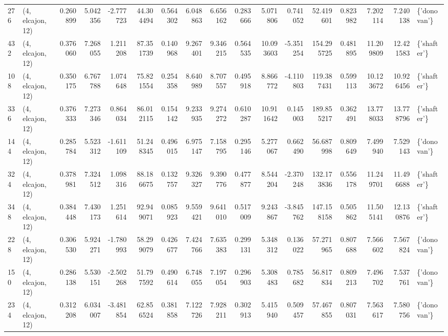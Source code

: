 \begin{tabular}{llrrrrrrrrrrrrrrl}
276 &  (4, elcajon, 12) &   0.260899 &   5.042356 &  -2.777723 &    44.304494 &   0.564302 &   6.048863 &   6.656162 &  0.283666 &   5.071806 &   0.741052 &    52.419601 &   0.823982 &   7.202114 &   7.240138 &  \{'donovan'\} \\
432 &  (4, elcajon, 12) &   0.376060 &   7.268055 &   1.211208 &    87.351739 &   0.140968 &   9.267401 &   9.346215 &  0.564535 &  10.093603 &  -5.351254 &   154.295725 &   0.481895 &  11.209809 &  12.421583 &  \{'shafter'\} \\
108 &  (4, elcajon, 12) &   0.350175 &   6.767788 &   1.074648 &    75.821554 &   0.254358 &   8.640989 &   8.707557 &  0.495918 &   8.866772 &  -4.110803 &   119.387431 &   0.599113 &  10.123672 &  10.926456 &  \{'shafter'\} \\
336 &  (4, elcajon, 12) &   0.376333 &   7.273346 &   0.864034 &    86.012115 &   0.154142 &   9.233935 &   9.274272 &  0.610287 &  10.911642 &   0.145003 &   189.855217 &   0.362491 &  13.778033 &  13.778796 &  \{'shafter'\} \\
144 &  (4, elcajon, 12) &   0.285784 &   5.523312 &  -1.611109 &    51.248345 &   0.496015 &   6.975147 &   7.158795 &  0.295146 &   5.277067 &   0.662490 &    56.687998 &   0.809649 &   7.499940 &   7.529143 &  \{'donovan'\} \\
324 &  (4, elcajon, 12) &   0.378981 &   7.324512 &   1.098316 &    88.186675 &   0.132757 &   9.326327 &   9.390776 &  0.477877 &   8.544204 &  -2.370248 &   132.173836 &   0.556178 &  11.249701 &  11.496688 &  \{'shafter'\} \\
348 &  (4, elcajon, 12) &   0.384448 &   7.430173 &   1.251614 &    92.949071 &   0.085923 &   9.559421 &   9.641010 &  0.517009 &   9.243867 &  -3.845762 &   147.158158 &   0.505862 &  11.505141 &  12.130876 &  \{'shafter'\} \\
228 &  (4, elcajon, 12) &   0.306530 &   5.924271 &  -1.780993 &    58.299079 &   0.426677 &   7.424766 &   7.635383 &  0.299131 &   5.348312 &   0.136022 &    57.271965 &   0.807688 &   7.566602 &   7.567824 &  \{'donovan'\} \\
150 &  (4, elcajon, 12) &   0.286138 &   5.530151 &  -2.502268 &    51.797592 &   0.490614 &   6.748055 &   7.197054 &  0.296903 &   5.308483 &   0.785682 &    56.817834 &   0.809213 &   7.496702 &   7.537761 &  \{'donovan'\} \\
234 &  (4, elcajon, 12) &   0.312208 &   6.034007 &  -3.481854 &    62.856524 &   0.381858 &   7.122726 &   7.928211 &  0.302913 &   5.415940 &   0.509457 &    57.467855 &   0.807031 &   7.563617 &   7.580756 &  \{'donovan'\} \\

\end{tabular}
